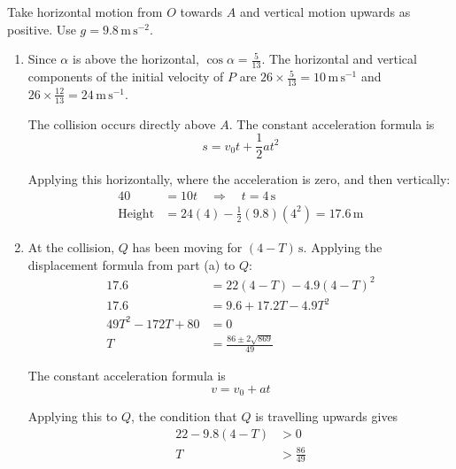 \documentclass[leqno]{article}
\begin{document}
\begin{enumerate}[
  label=\textbf{\arabic*.},
  leftmargin=*,
  topsep=0pt,
  partopsep=0pt,
  parsep=0pt
]
\begin{djsSolution}
\begin{djsSolutionFigure}
\end{djsSolutionFigure}

Take horizontal motion from \(O\) towards \(A\) and vertical motion upwards as positive. Use \(g=9.8\,\mathrm{m\,s^{-2}}\).

\begin{enumerate}[label=\textbf{(\alph*)}, start=1]
\item Since \(\alpha\) is above the horizontal, \(\cos\alpha=\frac{5}{13}\). The horizontal and vertical components of the initial velocity of \(P\) are \(26\times\frac{5}{13}=10\,\mathrm{m\,s^{-1}}\) and \(26\times\frac{12}{13}=24\,\mathrm{m\,s^{-1}}\).

The collision occurs directly above \(A\). The constant acceleration formula is
\[
s=v_0t+\frac12at^2
\]

Applying this horizontally, where the acceleration is zero, and then vertically:
\begin{align*}
40&=10t \quad\Longrightarrow\quad t=4\,\mathrm{s} \\
\text{Height}&=24(4)-\frac12(9.8)(4^2)=17.6\,\mathrm{m}
\end{align*}

\item At the collision, \(Q\) has been moving for \((4-T)\,\mathrm{s}\). Applying the displacement formula from part (a) to \(Q\):
\begin{align*}
17.6&=22(4-T)-4.9(4-T)^2 \\
17.6&=9.6+17.2T-4.9T^2 \\
49T^2-172T+80&=0 \\
T&=\frac{86\pm2\sqrt{869}}{49}
\end{align*}

The constant acceleration formula is
\[
v=v_0+at
\]

Applying this to \(Q\), the condition that \(Q\) is travelling upwards gives
\begin{align*}
22-9.8(4-T)&>0 \\
T&>\frac{86}{49}
\end{align*}


\end{enumerate}
\end{djsSolution}
\end{enumerate}
\end{document}
